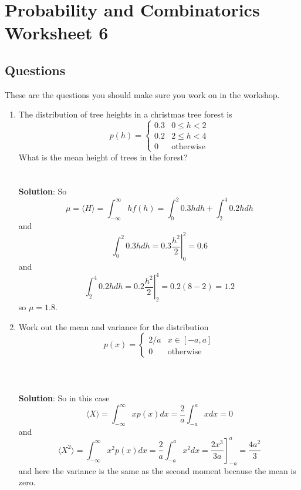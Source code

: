 \documentclass[11pt,a4paper]{scrartcl}
\begin{document}
\section*{Probability and Combinatorics Worksheet 6}


\subsection*{Questions}

These are the questions you should make sure you work on in the workshop.

\begin{enumerate}


\item The distribution of tree heights in a christmas tree forest is 
\begin{equation}
p(h)=\left\{\begin{array}{cc}0.3& 0\le h <2\\0.2& 2\le h<4\\0&\mbox{otherwise}\end{array}\right.
\end{equation}
What is the mean height of trees in the forest?
\\ \\ \\
\textbf{Solution}: So 
\begin{equation}
\mu =\langle H\rangle=\int_{-\infty}^\infty hf(h)=\int_{0}^2 {0.3h}dh+\int_2^4{0.2h}dh
\end{equation}
and
\begin{equation}
\int_{0}^2 {0.3h}dh=\left.0.3\frac{h^2}{2}\right|_0^2=0.6
\end{equation}
and
\begin{equation}
\int_{2}^4 {0.2h}dh=\left.0.2\frac{h^2}{2}\right|_2^4=0.2 (8-2)=1.2
\end{equation}
so $\mu=1.8$.

\item Work out the mean and variance for the distribution
  \begin{equation}
    p(x)=\left\{\begin{array}{ll}2/a&x\in [-a,a]\\0&\mbox{otherwise}\end{array}\right.
  \end{equation}
\\ \\ \\
\textbf{Solution}: So in this case
\begin{equation}
  \langle X\rangle =\int_{-\infty}^\infty xp(x)dx=\frac{2}{a}\int_{-a}^a xdx=0
\end{equation}
and
\begin{equation}
  \langle X^2\rangle =\int_{-\infty}^\infty x^2p(x)dx=\frac{2}{a}\int_{-a}^a x^2dx=\left.\frac{2x^3}{3a}\right]_{-a}^a=\frac{4a^2}{3}
\end{equation}
and here the variance is the same as the second moment because the mean is zero.
  

\end{enumerate}
\end{document}
